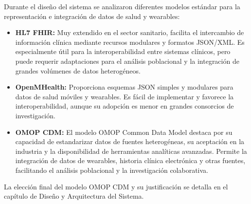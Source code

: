 Durante el diseño del sistema se analizaron diferentes modelos estándar para la representación e integración de datos de salud y wearables:

\begin{itemize}
    \item \textbf{HL7 FHIR:} Muy extendido en el sector sanitario, facilita el intercambio de información clínica mediante recursos modulares y formatos JSON/XML. Es especialmente útil para la interoperabilidad entre sistemas clínicos, pero puede requerir adaptaciones para el análisis poblacional y la integración de grandes volúmenes de datos heterogéneos.
    \item \textbf{OpenMHealth:} Proporciona esquemas JSON simples y modulares para datos de salud móviles y wearables. Es fácil de implementar y favorece la interoperabilidad, aunque su adopción es menor en grandes consorcios de investigación.
    \item \textbf{OMOP CDM:} El modelo OMOP Common Data Model destaca por su capacidad de estandarizar datos de fuentes heterogéneas, su aceptación en la industria y la disponibilidad de herramientas analíticas avanzadas. Permite la integración de datos de wearables, historia clínica electrónica y otras fuentes, facilitando el análisis poblacional y la investigación colaborativa.
\end{itemize}

La elección final del modelo OMOP CDM y su justificación se detalla en el capítulo de Diseño y Arquitectura del Sistema.
